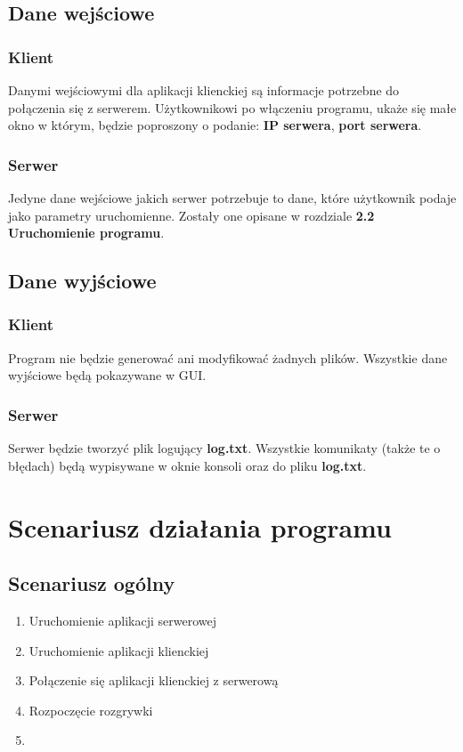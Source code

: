 \documentclass{article}
\begin{document}
    \subsection{Dane wejściowe}
        \subsubsection{Klient}
            Danymi wejściowymi dla aplikacji klienckiej są informacje potrzebne do połączenia się z serwerem.
            Użytkownikowi po włączeniu programu, ukaże się małe okno w którym, będzie poproszony o podanie: \textbf{IP serwera}, \textbf{port serwera}.
        
        \subsubsection{Serwer}
            Jedyne dane wejściowe jakich serwer potrzebuje to dane, które użytkownik podaje jako parametry uruchomienne. Zostały one opisane w rozdziale \textbf{2.2 Uruchomienie programu}.
    
    \subsection{Dane wyjściowe}
        \subsubsection{Klient}
            Program nie będzie generować ani modyfikować żadnych plików. Wszystkie dane wyjściowe będą pokazywane w GUI.
        
        \subsubsection{Serwer}
            Serwer będzie tworzyć plik logujący \textbf{log.txt}. Wszystkie komunikaty (także te o błędach) będą wypisywane w oknie konsoli oraz do pliku \textbf{log.txt}.

\section{Scenariusz działania programu}
    \subsection{Scenariusz ogólny}
        \begin{enumerate}
            \item Uruchomienie aplikacji serwerowej
            \item Uruchomienie aplikacji klienckiej
            \item Połączenie się aplikacji klienckiej z serwerową
            \item Rozpoczęcie rozgrywki
            \item %
        \end{enumerate}
    
\end{document}
